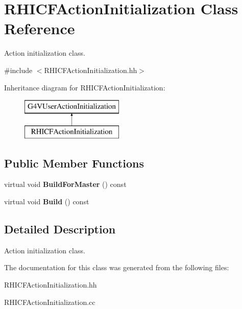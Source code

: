 \hypertarget{class_r_h_i_c_f_action_initialization}{}\section{R\+H\+I\+C\+F\+Action\+Initialization Class Reference}
\label{class_r_h_i_c_f_action_initialization}


Action initialization class.  




{\ttfamily \#include $<$R\+H\+I\+C\+F\+Action\+Initialization.\+hh$>$}

Inheritance diagram for R\+H\+I\+C\+F\+Action\+Initialization\+:\begin{figure}[H]
\begin{center}
\leavevmode
\includegraphics[height=2.000000cm]{class_r_h_i_c_f_action_initialization}
\end{center}
\end{figure}
\subsection*{Public Member Functions}
\begin{DoxyCompactItemize}
\item 
\hypertarget{class_r_h_i_c_f_action_initialization_a924cf44864114ca218a5901b153fde12}{}virtual void {\bfseries Build\+For\+Master} () const \label{class_r_h_i_c_f_action_initialization_a924cf44864114ca218a5901b153fde12}

\item 
\hypertarget{class_r_h_i_c_f_action_initialization_aca5ab38c02f02f18eddf39fe05936719}{}virtual void {\bfseries Build} () const \label{class_r_h_i_c_f_action_initialization_aca5ab38c02f02f18eddf39fe05936719}

\end{DoxyCompactItemize}


\subsection{Detailed Description}
Action initialization class. 

The documentation for this class was generated from the following files\+:\begin{DoxyCompactItemize}
\item 
R\+H\+I\+C\+F\+Action\+Initialization.\+hh\item 
R\+H\+I\+C\+F\+Action\+Initialization.\+cc\end{DoxyCompactItemize}
